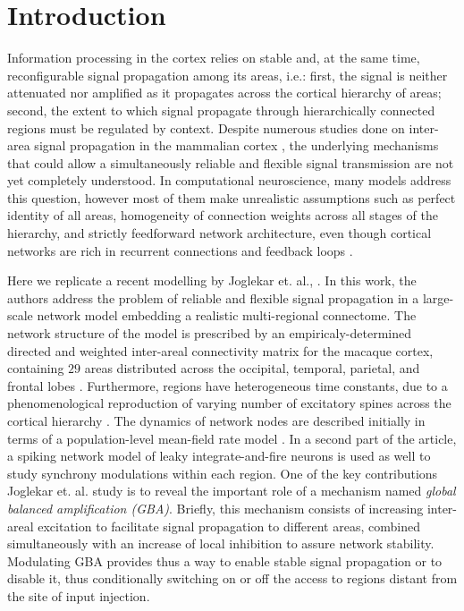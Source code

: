 \setlength{\parindent}{1cm} %

\section{Introduction}\label{introduction}

Information processing in the cortex relies on stable and, at the same time, reconfigurable signal propagation among its areas, i.e.: first, the signal is neither attenuated nor amplified as it propagates across the cortical hierarchy of areas; second, the extent to which signal propagate through hierarchically connected regions must be regulated by context. Despite numerous studies done on inter-area signal propagation in the mammalian cortex \cite{van2002fast, kumar2008conditions,kumar2010spiking}, the underlying mechanisms that could allow a simultaneously reliable and flexible signal transmission are not yet completely understood. In computational neuroscience, many models address this question, however most of them make  unrealistic assumptions such as perfect identity of all areas, homogeneity of connection weights across all stages of the hierarchy, and strictly feedforward network architecture,  even though cortical networks are rich in recurrent connections and feedback loops \cite{markov2014b}.

\indent Here we replicate a recent modelling by Joglekar et. al., \cite{joglekar2018inter}. In this work, the authors address the problem of reliable and flexible signal propagation in a large-scale network model embedding a realistic multi-regional connectome. The network structure of the model is prescribed by an empiricaly-determined directed and weighted inter-areal connectivity matrix for the macaque cortex, containing $29$ areas distributed across the occipital, temporal, parietal, and frontal lobes \cite{markov2014b}. Furthermore, regions have heterogeneous time constants, due to a phenomenological reproduction of varying number of excitatory spines across the cortical hierarchy \cite{Elston2007}. The dynamics of network nodes are described initially in terms of a population-level mean-field rate model \cite{chaudhuri2015large,mejias2016feedforward}. In a second part of the article, a spiking network model of leaky integrate-and-fire neurons is used as well to study synchrony modulations within each region.  One of the key contributions Joglekar et. al. \cite{joglekar2018inter} study is to reveal the important role of a mechanism named \emph{global balanced amplification (GBA)}. Briefly, this mechanism consists of increasing inter-areal excitation to facilitate signal propagation to different areas, combined simultaneously with an increase of local inhibition to assure network stability. Modulating GBA provides thus a way to enable stable signal propagation or to disable it, thus conditionally switching on or off the access to regions distant from the site of input injection.

